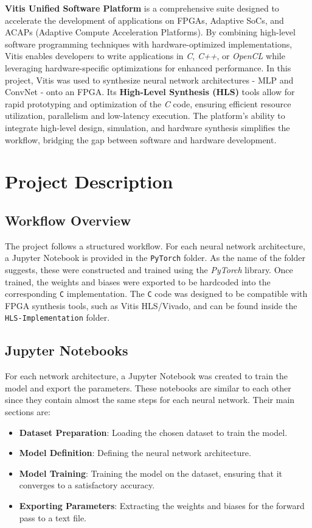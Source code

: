 \documentclass{article}
\begin{document}
\textbf{Vitis Unified Software Platform} is a comprehensive suite designed to accelerate the development of applications on FPGAs, Adaptive SoCs, and ACAPs (Adaptive Compute Acceleration Platforms). By combining high-level software programming techniques with hardware-optimized implementations, Vitis enables developers to write applications in \textit{C}, \textit{C++}, or \textit{OpenCL} while leveraging hardware-specific optimizations for enhanced performance. In this project, Vitis was used to synthesize neural network architectures - MLP and ConvNet - onto an FPGA. Its \textbf{High-Level Synthesis (HLS)} tools allow for rapid prototyping and optimization of the \textit{C} code, ensuring efficient resource utilization, parallelism and low-latency execution. The platform's ability to integrate high-level design, simulation, and hardware synthesis simplifies the workflow, bridging the gap between software and hardware development.


\section{Project Description}
\subsection{Workflow Overview}
The project follows a structured workflow. For each neural network architecture, a Jupyter Notebook is provided in the \texttt{PyTorch} folder. As the name of the folder suggests, these were constructed and trained using the \textit{PyTorch} library. Once trained, the weights and biases were exported to be hardcoded into the corresponding \texttt{C} implementation. The \texttt{C} code was designed to be compatible with FPGA synthesis tools, such as Vitis HLS/Vivado, and can be found inside the \texttt{HLS-Implementation} folder.

\subsection{Jupyter Notebooks}
For each network architecture, a Jupyter Notebook was created to train the model and export the parameters. These notebooks are similar to each other since they contain almost the same steps for each neural network. Their main sections are:
\begin{itemize}
    \item \textbf{Dataset Preparation}: Loading the chosen dataset to train the model.
    \item \textbf{Model Definition}: Defining the neural network architecture.
    \item \textbf{Model Training}: Training the model on the dataset, ensuring that it converges to a satisfactory accuracy.
    \item \textbf{Exporting Parameters}: Extracting the weights and biases for the forward pass to a text file.
\end{itemize}
\end{document}
